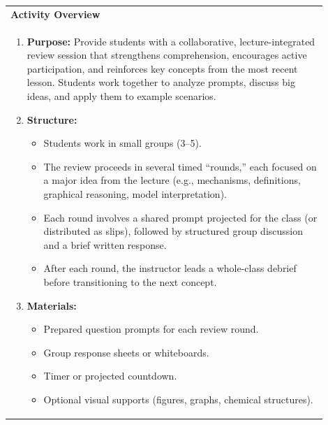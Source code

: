 \documentclass{article}
\begin{document}
\begin{tabular}{|p{0.9\linewidth}|}
\hline
{\large\textbf{Activity Overview}} \\
\begin{enumerate}[label=\alph*.]
    \item \textbf{Purpose:} Provide students with a collaborative, lecture-integrated review session that strengthens comprehension, encourages active participation, and reinforces key concepts from the most recent lesson. Students work together to analyze prompts, discuss big ideas, and apply them to example scenarios.
    
    \item \textbf{Structure:} 
    \begin{itemize}
        \item Students work in small groups (3–5).
        \item The review proceeds in several timed “rounds,” each focused on a major idea from the lecture (e.g., mechanisms, definitions, graphical reasoning, model interpretation).
        \item Each round involves a shared prompt projected for the class (or distributed as slips), followed by structured group discussion and a brief written response.
        \item After each round, the instructor leads a whole-class debrief before transitioning to the next concept.
    \end{itemize}
    
    \item \textbf{Materials:} 
    \begin{itemize}
        \item Prepared question prompts for each review round.
        \item Group response sheets or whiteboards.
        \item Timer or projected countdown.
        \item Optional visual supports (figures, graphs, chemical structures).
    \end{itemize}
\end{enumerate} \\
\hline
\end{tabular}
\newpage
\end{document}
